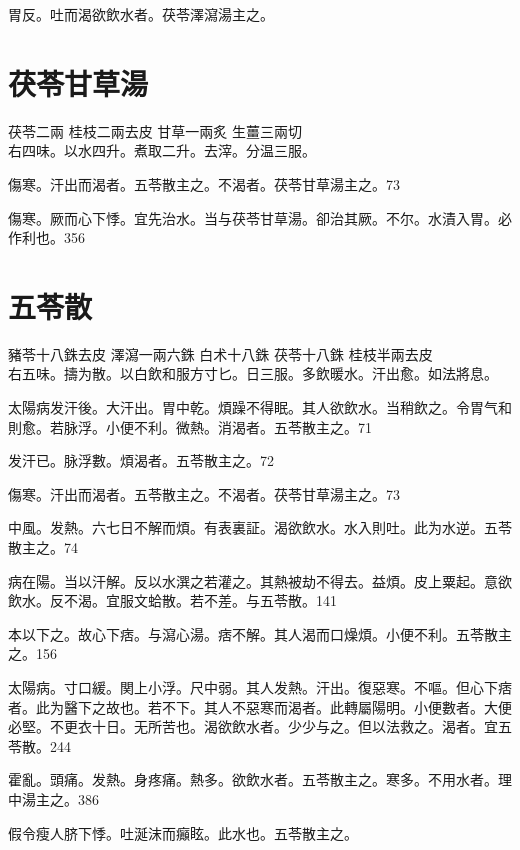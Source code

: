 胃反。吐而渴欲飲水者。茯苓澤瀉湯主之。


\section{茯苓甘草湯}

茯苓{\scriptsize 二兩} 桂枝{\scriptsize 二兩去皮} 甘草{\scriptsize 一兩炙} 生薑{\scriptsize 三兩切}\\
右四味。以水四升。煮取二升。去滓。分温三服。

傷寒。汗出而渴者。五苓散主之。不渴者。茯苓甘草湯主之。73

傷寒。厥而心下悸。宜先治水。当与茯苓甘草湯。卻治其厥。不尔。水漬入胃。必作利也。356

\section{五苓散}

豬苓{\scriptsize 十八銖去皮} 澤瀉{\scriptsize 一兩六銖} 白术{\scriptsize 十八銖} 茯苓{\scriptsize 十八銖} 桂枝{\scriptsize 半兩去皮}\\
右五味。擣为散。以白飲和服方寸匕。日三服。多飲暖水。汗出愈。如法將息。

太陽病发汗後。大汗出。胃中乾。煩躁不得眠。其人欲飲水。当稍飲之。令胃气和則愈。若脉浮。小便不利。微熱。消渴者。五苓散主之。71

发汗已。脉浮數。煩渴者。五苓散主之。72

傷寒。汗出而渴者。五苓散主之。不渴者。茯苓甘草湯主之。73

中風。发熱。六七日不解而煩。有表裏証。渴欲飲水。水入則吐。此为水逆。五苓散主之。74

病在陽。当以汗解。反以水潠之若灌之。其熱被劫不得去。益煩。皮上粟起。意欲飲水。反不渴。宜服文蛤散。若不差。与五苓散。141

本以下之。故心下痞。与瀉心湯。痞不解。其人渴而口燥{\khaai 煩}。小便不利。五苓散主之。156

太陽病。寸{\khaai 口}緩。関{\khaai 上小}浮。尺{\khaai 中}弱。其人发熱。汗出。復惡寒。不嘔。但心下痞者。此为醫下之故也。若不下。其人不惡寒而渴者。此轉屬陽明。小便數者。大便必堅。不更衣十日。无所苦也。{\khaai 渴}欲飲水者。少少与之。但以法救之。渴者。宜五苓散。244

霍亂。頭痛。发熱。身疼痛。熱多。欲飲水者。五苓散主之。寒多。不用水者。理中湯主之。386

假令瘦人脐下悸。吐涎沫而癲眩。{\khaai 此}水也。五苓散主之。

